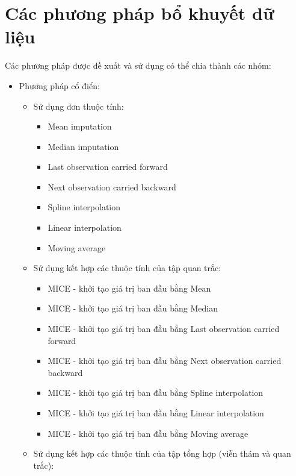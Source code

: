 \section{Các phương pháp bổ khuyết dữ liệu}
Các phương pháp được đề xuất và sử dụng có thể chia thành các nhóm:
\begin{itemize}
    \item Phương pháp cổ điển:
        \begin{itemize}
            \item Sử dụng đơn thuộc tính:
                \begin{itemize}
                    \item Mean imputation
                    \item Median imputation
                    \item Last observation carried forward
                    \item Next observation carried backward
                    \item Spline interpolation
                    \item Linear interpolation
                    \item Moving average
                \end{itemize}
            \item Sử dụng kết hợp các thuộc tính của tập quan trắc:
                \begin{itemize}
                    \item MICE - khởi tạo giá trị ban đầu bằng Mean
                    \item MICE - khởi tạo giá trị ban đầu bằng Median
                    \item MICE - khởi tạo giá trị ban đầu bằng Last observation carried forward 
                    \item MICE - khởi tạo giá trị ban đầu bằng Next observation carried backward
                    \item MICE - khởi tạo giá trị ban đầu bằng Spline interpolation
                    \item MICE - khởi tạo giá trị ban đầu bằng Linear interpolation
                    \item MICE - khởi tạo giá trị ban đầu bằng Moving average
                \end{itemize}
            \item Sử dụng kết hợp các thuộc tính của tập tổng hợp (viễn thám và quan trắc):
                \begin{itemize}

\end{itemize}
\end{itemize}
\end{itemize}
